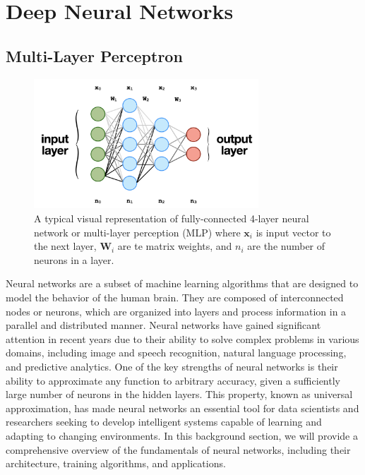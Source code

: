 
\section{Deep Neural Networks}
\subsection{Multi-Layer Perceptron}
\FloatBarrier
\begin{figure}[ht]
   \centering
   \includegraphics[width=0.75\textwidth]{figures/mlp.png}
   \caption{A typical visual representation of fully-connected 4-layer neural network or multi-layer perception (MLP) where $\boldsymbol{x}_i$ is input vector to the next layer, $\boldsymbol{W}_i$ are te matrix weights, and $n_i$ are the number of neurons in a layer. }
   \label{fig:mlp}
\end{figure}
\FloatBarrier

Neural networks are a subset of machine learning algorithms that are designed to model the behavior of the human brain. They are composed of interconnected nodes or neurons, which are organized into layers and process information in a parallel and distributed manner. Neural networks have gained significant attention in recent years due to their ability to solve complex problems in various domains, including image and speech recognition, natural language processing, and predictive analytics. One of the key strengths of neural networks is their ability to approximate any function to arbitrary accuracy, given a sufficiently large number of neurons in the hidden layers. This property, known as universal approximation, has made neural networks an essential tool for data scientists and researchers seeking to develop intelligent systems capable of learning and adapting to changing environments. In this background section, we will provide a comprehensive overview of the fundamentals of neural networks, including their architecture, training algorithms, and applications.



